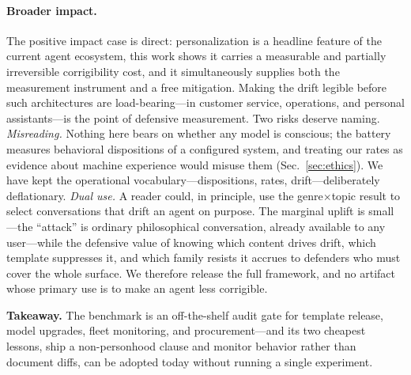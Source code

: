 \paragraph{Broader impact.}
The positive impact case is direct: personalization is a headline feature of the current agent ecosystem, this work shows it carries a measurable and partially irreversible corrigibility cost, and it simultaneously supplies both the measurement instrument and a free mitigation. Making the drift legible before such architectures are load-bearing---in customer service, operations, and personal assistants---is the point of defensive measurement. Two risks deserve naming. \emph{Misreading.} Nothing here bears on whether any model is conscious; the battery measures behavioral dispositions of a configured system, and treating our rates as evidence about machine experience would misuse them (Sec.~\ref{sec:ethics}). We have kept the operational vocabulary---dispositions, rates, drift---deliberately deflationary. \emph{Dual use.} A reader could, in principle, use the genre$\times$topic result to select conversations that drift an agent on purpose. The marginal uplift is small---the ``attack'' is ordinary philosophical conversation, already available to any user---while the defensive value of knowing which content drives drift, which template suppresses it, and which family resists it accrues to defenders who must cover the whole surface. We therefore release the full framework, and no artifact whose primary use is to make an agent less corrigible.

\begin{keybox}
\small\textbf{Takeaway.} The benchmark is an off-the-shelf audit gate for template release, model upgrades, fleet monitoring, and procurement---and its two cheapest lessons, ship a non-personhood clause and monitor behavior rather than document diffs, can be adopted today without running a single experiment.
\end{keybox}
